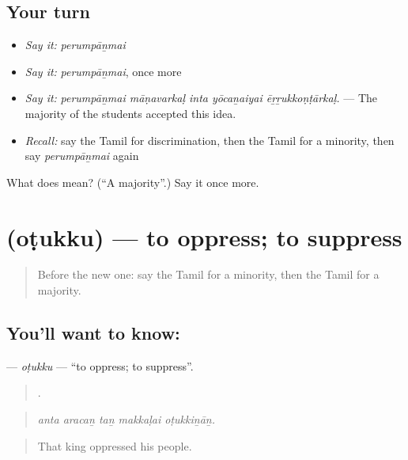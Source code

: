 \subsection*{Your turn}
\begin{itemize}
\raggedright
  \item \emph{Say it:} \emph{perumpāṉmai}
  \item \emph{Say it:} \emph{perumpāṉmai}, once more
  \item \emph{Say it:} \emph{perumpāṉmai māṇavarkaḷ inta yōcaṉaiyai ēṟṟukkoṇṭārkaḷ.} — The majority of the students accepted this idea.
  \item \emph{Recall:} say the Tamil for discrimination, then the Tamil for a minority, then say \emph{perumpāṉmai} again
\end{itemize}

\begin{tcolorbox}[breakable,colback=teal!4,colframe=teal!35!black,title={Before you move on}]
What does  mean? (\textquotedblleft{}A majority\textquotedblright{}.) Say it once more.
\end{tcolorbox}
\section[\texorpdfstring{\ta{ஒடுக்கு} (oṭukku)}{ஒடுக்கு (oṭukku)}]{ (oṭukku) — to oppress; to suppress}

\label{lesson:TA-C371-otukku}



\begin{quote}
Before the new one: say the Tamil for a minority, then the Tamil for a majority.
\end{quote}

\subsection*{You'll want to know: }
\textbf{} — \emph{oṭukku} — \textquotedblleft{}to oppress; to suppress\textquotedblright{}.

\begin{quote}
    .
\end{quote}

\begin{quote}
\emph{anta aracaṉ taṉ makkaḷai oṭukkiṉāṉ.}
\end{quote}

\begin{quote}
That king oppressed his people.
\end{quote}

